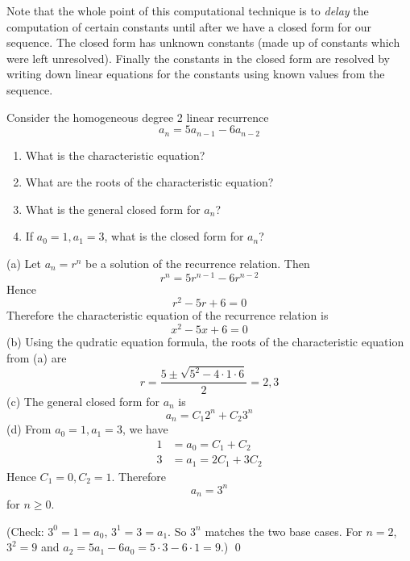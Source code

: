 Note that the whole point of this computational technique is to 
\textit{delay} the computation of certain constants until after we have
a closed form for our sequence.
The closed form has unknown constants (made up of constants
which were left unresolved).
Finally the constants in the closed form are resolved by writing
down linear equations for the constants using
known values from the sequence.

\begin{eg}
  Consider the homogeneous degree 2 linear recurrence
  \[
  a_n = 5a_{n-1} - 6a_{n-2}
  \]
  \begin{enumerate}[nosep,label=(\alph*)]
  \item What is the characteristic equation?
  \item What are the roots of the characteristic equation?
  \item What is the general closed form for $a_n$?
  \item If $a_0 = 1, a_1 = 3$, what is the closed form for $a_n$?
  \end{enumerate}
\end{eg}
\SOLUTION
(a) Let $a_n = r^n$ be a solution of the recurrence relation.
Then
\[
r^n = 5 r^{n-1} - 6 r^{n-2}
\]
Hence
\[
r^2 - 5 r + 6 = 0
\]
Therefore the characteristic equation of the recurrence relation
is
\[
x^2 - 5x + 6 = 0
\]
(b)
Using the qudratic equation formula,
the roots of the characteristic equation from (a) are
\[
r = \frac{5 \pm \sqrt{5^2 - 4 \cdot 1 \cdot 6}}{2} = 2, 3
\]
(c)
The general closed form for $a_n$ is
\[
a_n = C_1 2^n + C_2 3^n
\]
(d)
From $a_0 = 1, a_1 = 3$, we have
\begin{align*}
  1 &= a_0 = C_1 + C_2 \\
  3 &= a_1 = 2C_1 + 3C_2 
\end{align*}
Hence $C_1 = 0, C_2 = 1$.
Therefore
\[
a_n = 3^n
\]
for $n \geq 0$.

(Check: $3^0 = 1 = a_0$, $3^1 = 3 = a_1$. So $3^n$ matches
the two base cases.
For $n = 2$,
$3^2 = 9$ and $a_2 = 5a_{1} - 6a_{0} = 5 \cdot 3 - 6 \cdot 1 = 9$.)
\qed

